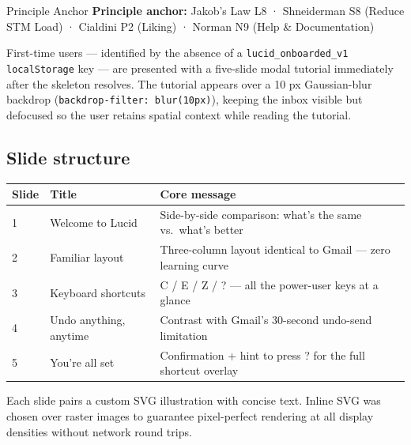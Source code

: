 \documentclass[12pt,a4paper]{report}
\begin{document}
\begin{principleBox}{Principle Anchor}
  \textbf{Principle anchor:} Jakob's Law L8 · Shneiderman S8 (Reduce STM Load) ·
  Cialdini P2 (Liking) · Norman N9 (Help \& Documentation)
\end{principleBox}

First-time users — identified by the absence of a \texttt{lucid\_onboarded\_v1}
\texttt{localStorage} key — are presented with a five-slide modal tutorial immediately after
the skeleton resolves. The tutorial appears over a 10 px Gaussian-blur backdrop
(\texttt{backdrop-filter: blur(10px)}), keeping the inbox visible but defocused so the
user retains spatial context while reading the tutorial.

\subsection*{Slide structure}

\begin{center}
\begin{tabular}{@{}lll@{}}
  \toprule
  \textbf{Slide} & \textbf{Title} & \textbf{Core message} \\
  \midrule
  1 & Welcome to Lucid        & Side-by-side comparison: what's the same vs.\ what's better \\
  2 & Familiar layout         & Three-column layout identical to Gmail — zero learning curve \\
  3 & Keyboard shortcuts      & C / E / Z / ? — all the power-user keys at a glance \\
  4 & Undo anything, anytime  & Contrast with Gmail's 30-second undo-send limitation \\
  5 & You're all set          & Confirmation + hint to press ? for the full shortcut overlay \\
  \bottomrule
\end{tabular}
\end{center}

Each slide pairs a custom SVG illustration with concise text. Inline SVG was chosen over
raster images to guarantee pixel-perfect rendering at all display densities without
network round trips.
\end{document}
